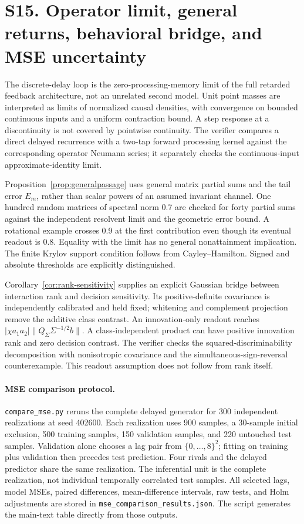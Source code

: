 \documentclass[11pt,a4paper]{article}
\begin{document}
\section*{S15. Operator limit, general returns, behavioral bridge, and MSE uncertainty}
The discrete-delay loop is the zero-processing-memory limit of the full retarded feedback architecture, not an unrelated second model. Unit point masses are interpreted as limits of normalized causal densities, with convergence on bounded continuous inputs and a uniform contraction bound. A step response at a discontinuity is not covered by pointwise continuity. The verifier compares a direct delayed recurrence with a two-tap forward processing kernel against the corresponding operator Neumann series; it separately checks the continuous-input approximate-identity limit.

Proposition~\ref{prop:generalpassage} uses general matrix partial sums and the tail error $E_m$, rather than scalar powers of an assumed invariant channel. One hundred random matrices of spectral norm 0.7 are checked for forty partial sums against the independent resolvent limit and the geometric error bound. A rotational example crosses 0.9 at the first contribution even though its eventual readout is 0.8. Equality with the limit has no general nonattainment implication. The finite Krylov support condition follows from Cayley--Hamilton. Signed and absolute thresholds are explicitly distinguished.

Corollary~\ref{cor:rank-sensitivity} supplies an explicit Gaussian bridge between interaction rank and decision sensitivity. Its positive-definite covariance is independently calibrated and held fixed; whitening and complement projection remove the additive class contrast. An innovation-only readout reaches $|\chi a_1a_2|\|Q_\Sigma\Sigma^{-1/2}b\|$. A class-independent product can have positive innovation rank and zero decision contrast. The verifier checks the squared-discriminability decomposition with nonisotropic covariance and the simultaneous-sign-reversal counterexample. This readout assumption does not follow from rank itself.

\paragraph{MSE comparison protocol.} \texttt{compare\_mse.py} reruns the complete delayed generator for 300 independent realizations at seed 402600. Each realization uses 900 samples, a 30-sample initial exclusion, 500 training samples, 150 validation samples, and 220 untouched test samples. Validation alone chooses a lag pair from $\{0,\ldots,8\}^2$; fitting on training plus validation then precedes test prediction. Four rivals and the delayed predictor share the same realization. The inferential unit is the complete realization, not individual temporally correlated test samples. All selected lags, model MSEs, paired differences, mean-difference intervals, raw tests, and Holm adjustments are stored in \texttt{mse\_comparison\_results.json}. The script generates the main-text table directly from those outputs.
\end{document}
